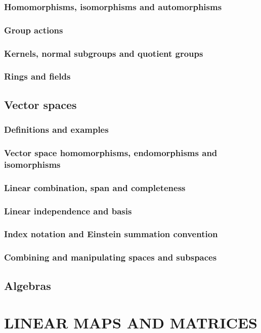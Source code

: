 \documentclass[a4paper,twoside]{article}
\theoremstyle{definition}
\theoremstyle{plain}
\begin{document}
\subsubsection{Homomorphisms, isomorphisms and automorphisms}
\subsubsection{Group actions}
\subsubsection{Kernels, normal subgroups and quotient groups}
\subsubsection{Rings and fields}
\subsection{Vector spaces}
\subsubsection{Definitions and examples}
\subsubsection{Vector space homomorphisms, endomorphisms and isomorphisms}
\subsubsection{Linear combination, span and completeness}
\subsubsection{Linear independence and basis}
\subsubsection{Index notation and Einstein summation convention}
\subsubsection{Combining and manipulating spaces and subspaces}
\subsection{Algebras}

\section{LINEAR MAPS AND MATRICES}
\end{document}
